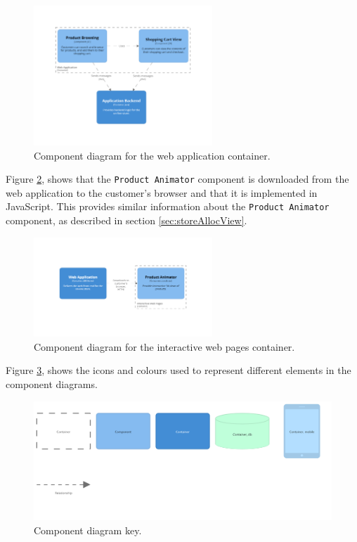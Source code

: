\begin{figure}[h!]
    \centering
    \includegraphics[trim=190 193 190 195,clip,width=0.6\textwidth]{images/c4/webapp_component_diagram.png}
    \caption{Component diagram for the web application container.}
    \label{fig:c4_component_webapp}
\end{figure}

\noindent
Figure \ref{fig:c4_component_browser}, shows that the \texttt{Product Animator} component
is downloaded from the web application to the customer's browser and that it is implemented in JavaScript.
This provides similar information about the \texttt{Product Animator} component, as described in section \ref{sec:storeAllocView}.

\begin{figure}[h!]
    \centering
    \includegraphics[trim=245 265 245 270,clip,width=0.6\textwidth]{images/c4/browser_component_diagram.png}
    \caption{Component diagram for the interactive web pages container.}
    \label{fig:c4_component_browser}
\end{figure}

\pagebreak
\noindent
Figure \ref{fig:c4_component_key}, shows the icons and colours used to represent different elements in the component diagrams.

\begin{figure}[h!]
    \centering
    \includegraphics[trim=15 210 90 20,clip,width=\textwidth]{images/c4/component_diagram-key.png}
    \caption{Component diagram key.}
    \label{fig:c4_component_key}
\end{figure}

